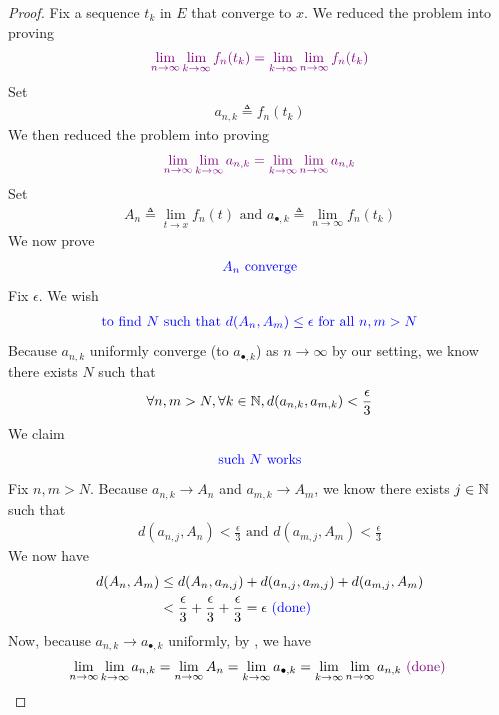 \documentclass{report}
\begin{document}
\begin{proof}
Fix a sequence $t_k$ in $E$ that converge to  $x$. We reduced the problem into proving
\begin{align*}
  \textcolor{violet}{\lim_{n\to \infty}\lim_{k \to \infty}f_n(t_k)=\lim_{k\to \infty}\lim_{n\to \infty}f_n(t_k)}
\end{align*}
Set 
\begin{align}
a_{n,k}\triangleq f_n(t_k)
\end{align}
We then reduced the problem into proving 
\begin{align*}
  \textcolor{violet}{\lim_{n\to \infty}\lim_{k\to \infty}a_{n,k}=\lim_{k\to \infty}\lim_{n\to \infty}a_{n,k}}
\end{align*}
Set 
\begin{align*}
A_n\triangleq \lim_{t \to x}f_n(t)\text{ and }a_{\bullet,k}\triangleq \lim_{n \to \infty}f_n(t_k)
\end{align*}
We now prove 
\begin{align*}
\textcolor{blue}{\text{ $A_n$ converge }}
\end{align*}
Fix $\epsilon $. We wish 
\begin{align*}
\textcolor{blue}{\text{ to find $N$ such that }d(A_n,A_m)\leq \epsilon \text{ for all $n,m>N$ }}
\end{align*}
Because $a_{n,k}$ uniformly converge (to $a_{\bullet , k}$) as $n \to \infty$ by our setting, we know there exists $N$ such that
\begin{align*}
\forall n,m>N,\forall k\in\mathbb{N}, d(a_{n,k},a_{m,k})<\frac{\epsilon}{3}
\end{align*}
We claim 
\begin{align*}
\textcolor{blue}{\text{ such $N$ works }}
\end{align*}
Fix $n,m>N$. Because $a_{n,k}\to A_n$ and $a_{m,k}\to A_m$, we know there exists $j \in\mathbb{N}$ such that 
\begin{align*}
d(a_{n,j},A_n)<\frac{\epsilon}{3}\text{ and }d(a_{m,j},A_m)<\frac{\epsilon}{3}
\end{align*}
We now have
\begin{align*}
  d(A_n,A_m)&\leq  d(A_n,a_{n,j})+d(a_{n,j},a_{m,j})+d(a_{m,j},A_m)\\
&< \frac{\epsilon}{3}+\frac{\epsilon}{3}+\frac{\epsilon}{3}=\epsilon \textcolor{blue}{\text{ (done) }}
\end{align*}
Now, because $a_{n,k}\to a_{\bullet ,k}$ uniformly, by , we have 
\begin{align*}
\lim_{n\to \infty}\lim_{k\to \infty}a_{n,k}=\lim_{n\to \infty}A_n=\lim_{k\to \infty}a_{\bullet ,k}=\lim_{k\to \infty}\lim_{n\to \infty}a_{n,k}\textcolor{violet}{\text{ (done) }}
\end{align*}
\end{proof}
\end{document}
